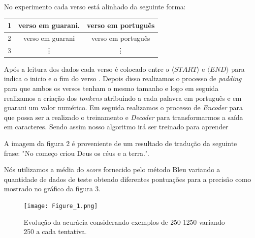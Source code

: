\documentclass[12pt]{article}
\begin{document}
No experimento cada verso está alinhado da seguinte forma:

\begin{center}
 \begin{tabular}{||c c c ||} 
 \hline
 1 & verso em guarani. & verso em português \\ [0.5ex] 
 \hline
 2 & verso em guarani & verso em português \\ 
 \hline
 3 & \vdots & \vdots  \\
 \hline
\end{tabular}
\end{center}

Após a leitura dos dados cada verso é colocado entre o $\langle\textit{START}\rangle$ e $\langle\textit{END}\rangle$ para indica o inicio e o fim do verso \cite{tensorflow}. Depois disso realizamos o processo de \textit{padding} para que ambos os versos tenham o mesmo tamanho e logo em seguida realizamos a criação dos \textit{tonkens} atribuindo a cada palavra em português e em guarani um valor numérico. Em seguida realizamos o processo de \textit{Encoder} para que possa ser a realizado o treinamento e \textit{Decoder} para transformarmos a saída em caracteres. Sendo assim nosso algoritmo irá ser treinado para aprender 

A imagem da figura 2 é proveniente de um resultado
de tradução da seguinte frase:
"No começo criou Deus os céus e a terra.".

Nós utilizamos a média do \textit{score} fornecido pelo método Bleu variando a quantidade de dados de teste obtendo diferentes pontuações para a precisão como mostrado no gráfico da figura 3.


\begin{figure}[h!]
\texttt{[image: Figure\_1.png]}
\caption{Evolução da acurácia considerando exemplos de 250-1250 variando 250 a cada tentativa. }
\label{fig:figure1}
\end{figure}
\end{document}

